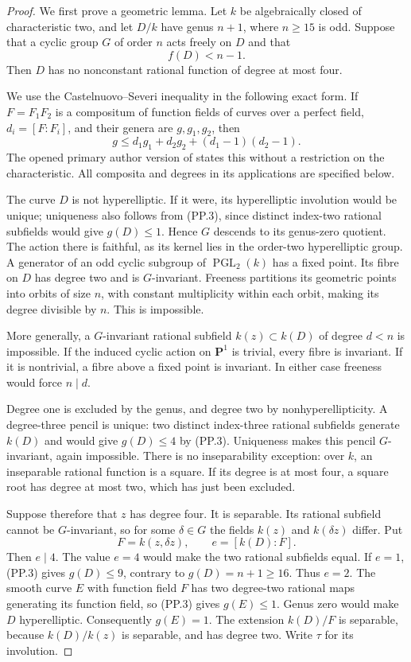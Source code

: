 \begin{proof}
We first prove a geometric lemma. Let $k$ be algebraically
closed of characteristic two, and let $D/k$ have genus
$n+1$, where $n\ge15$ is odd. Suppose that a cyclic group
$G$ of order $n$ acts freely on $D$ and that
\[
                            f(D)<n-1.                     \tag{PP.2}
\]
Then $D$ has no nonconstant rational function of degree at
most four.

We use the Castelnuovo--Severi inequality in the following
exact form. If $F=F_1F_2$ is a compositum of function
fields of curves over a perfect field, $d_i=[F:F_i]$, and
their genera are $g,g_1,g_2$, then
\[
              g\le d_1g_1+d_2g_2+(d_1-1)(d_2-1).
                                                               \tag{PP.3}
\]
The opened primary author version of
\citet[Proposition 2.1, author p.~3]{A_PrimPoonen2007}
states this without a restriction on the characteristic.
All composita and degrees in its applications are
specified below.

The curve $D$ is not hyperelliptic. If it were, its
hyperelliptic involution would be unique; uniqueness also
follows from (PP.3), since distinct index-two rational
subfields would give $g(D)\le1$. Hence $G$ descends to
its genus-zero quotient. The action there is faithful,
as its kernel lies in the order-two hyperelliptic group.
A generator of an odd cyclic subgroup of
$\operatorname{PGL}_2(k)$ has a fixed point. Its fibre
on $D$ has degree two and is $G$-invariant. Freeness
partitions its geometric points into orbits of size $n$,
with constant multiplicity within each orbit, making
its degree divisible by $n$. This is impossible.

More generally, a $G$-invariant rational subfield
$k(z)\subset k(D)$ of degree $d<n$ is impossible. If
the induced cyclic action on $\mathbf P^1$ is trivial,
every fibre is invariant. If it is nontrivial, a fibre
above a fixed point is invariant. In either case
freeness would force $n\mid d$.

Degree one is excluded by the genus, and degree two by
nonhyperellipticity. A degree-three pencil is unique:
two distinct index-three rational subfields generate
$k(D)$ and would give $g(D)\le4$ by (PP.3).
Uniqueness makes this pencil $G$-invariant, again
impossible. There is no inseparability exception:
over $k$, an inseparable rational function is a square.
If its degree is at most four, a square root has degree
at most two, which has just been excluded.

Suppose therefore that $z$ has degree four. It is
separable. Its rational subfield cannot be
$G$-invariant, so for some $\delta\in G$ the fields
$k(z)$ and $k(\delta z)$ differ. Put
\[
                 F=k(z,\delta z),\qquad e=[k(D):F].
\]
Then $e\mid4$. The value $e=4$ would make the two
rational subfields equal. If $e=1$, (PP.3) gives
$g(D)\le9$, contrary to $g(D)=n+1\ge16$.
Thus $e=2$. The smooth curve $E$ with function field
$F$ has two degree-two rational maps generating its
function field, so (PP.3) gives $g(E)\le1$.
Genus zero would make $D$ hyperelliptic. Consequently
$g(E)=1$. The extension $k(D)/F$ is separable,
because $k(D)/k(z)$ is separable, and has degree two.
Write $\tau$ for its involution.


\end{proof}
